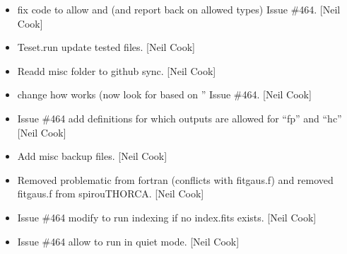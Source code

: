\documentclass[a4paper,10pt,english]{report}
\begin{document}
\begin{itemize}
\item {} 
 \sphinxhyphen{} fix code to allow  and  (and
report back on allowed types) \sphinxhyphen{} Issue \#464. {[}Neil Cook{]}

\item {} 
Teset.run \sphinxhyphen{} update tested files. {[}Neil Cook{]}

\item {} 
Re\sphinxhyphen{}add misc folder to github sync. {[}Neil Cook{]}

\item {} 
 \sphinxhyphen{} change how  works (now look for
 based on ” \sphinxhyphen{} Issue \#464. {[}Neil
Cook{]}

\item {} 
 \sphinxhyphen{} Issue \#464 \sphinxhyphen{} add definitions for which
outputs are allowed for “fp” and “hc” {[}Neil Cook{]}

\item {} 
Add misc backup files. {[}Neil Cook{]}

\item {} 
Removed problematic  from fortran (conflicts with fitgaus.f)
and removed fitgaus.f from spirouTHORCA. {[}Neil Cook{]}

\item {} 
 \sphinxhyphen{} Issue \#464 \sphinxhyphen{}  \sphinxhyphen{} modify to run
indexing if no index.fits exists. {[}Neil Cook{]}

\item {} 
 \sphinxhyphen{} Issue \#464 \sphinxhyphen{} allow  to run in
quiet mode. {[}Neil Cook{]}

\end{itemize}
\end{document}
